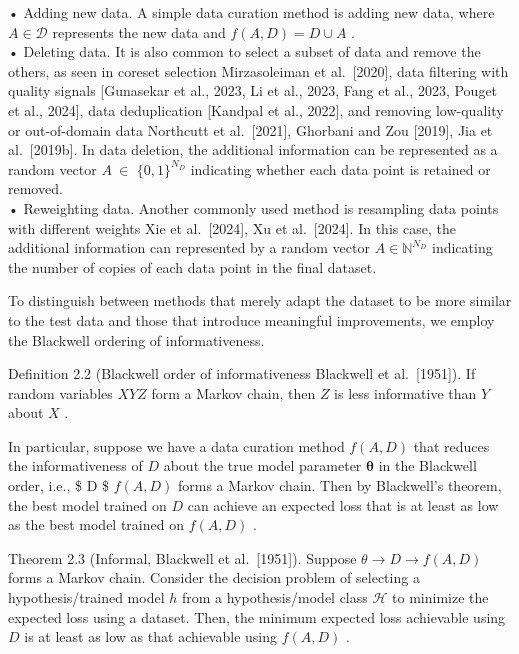 • Adding new data. A simple data curation method is adding new data,
where \(A \in { \mathcal { D } }\) represents the new data and
\(f ( A , D ) = D \cup A\) .\\
• Deleting data. It is also common to select a subset of data and remove
the others, as seen in coreset selection Mirzasoleiman et
al.~{[}2020{]}, data filtering with quality signals {[}Gunasekar et al.,
2023, Li et al., 2023, Fang et al., 2023, Pouget et al., 2024{]}, data
deduplication {[}Kandpal et al., 2022{]}, and removing low-quality or
out-of-domain data Northcutt et al.~{[}2021{]}, Ghorbani and Zou
{[}2019{]}, Jia et al.~{[}2019b{]}. In data deletion, the additional
information can be represented as a random vector \(A \ \in\)
\(\{ 0 , 1 \} ^ { N _ { D } }\) indicating whether each data point is
retained or removed.\\
• Reweighting data. Another commonly used method is resampling data
points with different weights Xie et al.~{[}2024{]}, Xu et
al.~{[}2024{]}. In this case, the additional information can represented
by a random vector \(A \in \mathbb { N } ^ { N _ { D } }\) indicating
the number of copies of each data point in the final dataset.

To distinguish between methods that merely adapt the dataset to be more
similar to the test data and those that introduce meaningful
improvements, we employ the Blackwell ordering of informativeness.

Definition 2.2 (Blackwell order of informativeness Blackwell et
al.~{[}1951{]}). If random variables \(X  Y  Z\) form a Markov chain,
then \(Z\) is less informative than \(Y\) about \(X\) .

In particular, suppose we have a data curation method \(f ( A , D )\)
that reduces the informativeness of \(D\) about the true model parameter
\(\pmb \theta\) in the Blackwell order, i.e., \$ D \$ \(f ( A , D )\)
forms a Markov chain. Then by Blackwell's theorem, the best model
trained on \(D\) can achieve an expected loss that is at least as low as
the best model trained on \(f ( A , D )\) .

Theorem 2.3 (Informal, Blackwell et al.~{[}1951{]}). Suppose
\(\theta \to D \to f ( A , D )\) forms a Markov chain. Consider the
decision problem of selecting a hypothesis/trained model \(h\) from a
hypothesis/model class \(\mathcal { H }\) to minimize the expected loss
using a dataset. Then, the minimum expected loss achievable using \(D\)
is at least as low as that achievable using \(f ( A , D )\) .

